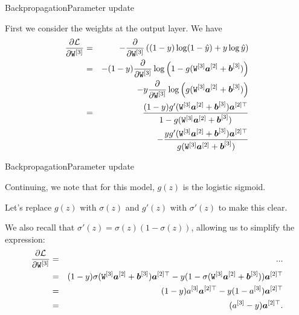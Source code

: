 \documentclass{beamer}
\renewcommand{\vec}[1]{\boldsymbol{#1}}
\newcommand{\mat}[1]{\mathtt{#1}}
\begin{document}
\begin{frame}{Backpropagation}{Parameter update}

  First we consider the weights at the output layer. We have
  \begin{eqnarray*}
    \frac{\partial {\cal L}}{\partial \mat{W}^{[3]}} & = &
    - \frac{\partial}{\partial \mat{W}^{[3]}} \left( (1-y)\log(1-\hat{y})+y \log \hat{y} \right) \\
    & = & -(1-y)\frac{\partial}{\partial \mat{W}^{[3]}} \log
    \left( 1 - g(\mat{W}^{[3]}\vec{a}^{[2]} + \vec{b}^{[3]}) \right) \\
    & & \;\;\;\;\; - y \frac{\partial}{\partial \mat{W}^{[3]}} \log \left(
    g(\mat{W}^{[3]}\vec{a}^{[2]} + \vec{b}^{[3]} ) \right) \\
    & = & \frac{(1-y)g'(\mat{W}^{[3]}\vec{a}^{[2]} + \vec{b}^{[3]})\vec{a}^{[2]\top}}{1 - g(\mat{W}^{[3]}\vec{a}^{[2]} + \vec{b}^{[3]})} \\
    & & \;\;\;\;\; -\frac{y g'(\mat{W}^{[3]}\vec{a}^{[2]} + \vec{b}^{[3]})\vec{a}^{[2]\top}}{g(\mat{W}^{[3]}\vec{a}^{[2]} + \vec{b}^{[3]} )}
  \end{eqnarray*}

\end{frame}


\begin{frame}{Backpropagation}{Parameter update}

  Continuing, we note that for this model, $g(z)$ is the logistic
  sigmoid.

  \medskip

  Let's replace $g(z)$ with $\sigma(z)$ and $g'(z)$ with
  $\sigma'(z)$ to make this clear.

  \medskip

  We also recall that $\sigma'(z) = \sigma(z)(1-\sigma(z))$, allowing
  us to simplify the expression:
  \begin{eqnarray*}
    \frac{\partial {\cal L}}{\partial \mat{W}^{[3]}} & = & ... \\
    & = & (1-y)\sigma(\mat{W}^{[3]}\vec{a}^{[2]} + \vec{b}^{[3]})\vec{a}^{[2]\top}    -y (1-\sigma(\mat{W}^{[3]}\vec{a}^{[2]} + \vec{b}^{[3]}))\vec{a}^{[2]\top}\\
    & = & (1-y)a^{[3]}\vec{a}^{[2]\top}-y (1-a^{[3]})\vec{a}^{[2]\top} \\
    & = & (a^{[3]}-y)\vec{a}^{[2]\top}.
  \end{eqnarray*}

\end{frame}
\end{document}

